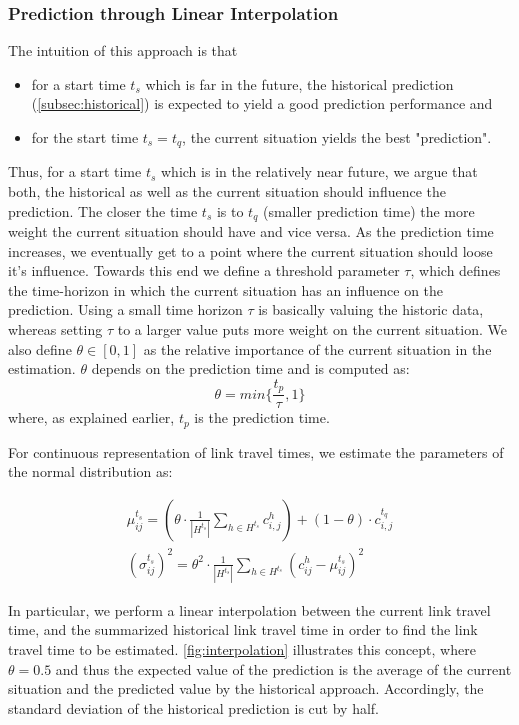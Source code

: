 \subsubsection{Prediction through Linear Interpolation}
\label{subsec:LI}
The intuition of this approach is that 
\begin{itemize}
  \item for a start time $t_s$ which is far in the future, the historical prediction (\cref{subsec:historical}) is expected to yield a good prediction performance and
\item for the start time $t_s = t_q$, the current situation yields the best "prediction".
\end{itemize}

Thus, for a start time $t_s$ which is in the relatively near future, we argue that both, the historical as well as the current situation should influence the prediction. The closer the time $t_s$ is to $t_q$ (smaller prediction time) the more weight the current situation should have and vice versa. As the prediction time increases, we eventually get to a point where the current situation should loose it's influence. Towards this end we define a threshold parameter $\tau$, which defines the time-horizon in which the current situation has an influence on the prediction. Using a small time horizon $\tau$ is basically valuing the historic data, whereas setting $\tau$ to a larger value puts more weight on the current situation. We also define $\theta \in [0,1]$ as the relative importance of the current situation in the estimation. $\theta$ depends on the prediction time and is computed as:
\begin{equation}
\theta = min \{\frac{t_p}{\tau}, 1 \}
\end{equation}
where, as explained earlier, $t_p$ is the prediction time.

For continuous representation of link travel times, we estimate the parameters of the normal distribution as:

\begin{gather}
	\mu_{ij}^{t_s} = \left(\theta\cdot\frac{1}{|H^{t_s}|}\sum_{h\in H^{t_s}} c_{i,j}^h \right)
	+ \left(1-\theta\right)\cdot c_{i,j}^{t_q}\\
	(\sigma_{ij}^{t_s})^2 = \theta^2 \cdot \frac{1}{|H^{t_s}|}\sum_{h\in H^{t_s}}
	(c_{ij}^h-\mu_{ij}^{t_s})^2
\end{gather}

In particular, we perform a linear interpolation between the current link travel time, and the summarized historical link travel time in order to find the link travel time to be estimated. \cref{fig:interpolation} illustrates this concept, where  $\theta = 0.5$ and thus the expected value of the prediction is the average of the current situation and the predicted value by the historical approach. Accordingly, the standard deviation of the historical prediction is cut by half.

